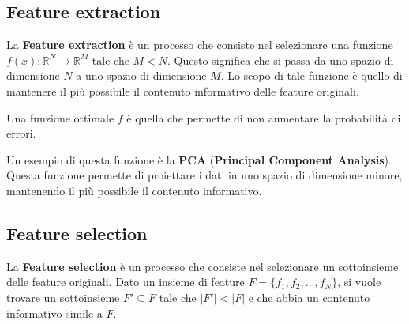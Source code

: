 \subsection{Feature extraction}
La \textbf{Feature extraction} è un processo che consiste nel selezionare una
funzione $f(x): \mathbb{R}^N \to \mathbb{R}^M$ tale che $M < N$. Questo
significa che si passa da uno spazio di dimensione $N$ a uno spazio di dimensione
$M$. Lo scopo di tale funzione è quello di mantenere il più possibile il
contenuto informativo delle feature originali.

Una funzione ottimale $f$ è quella che permette di non aumentare la probabilità
di errori.

Un esempio di questa funzione è la \textbf{PCA} (\textbf{Principal Component
      Analysis}). Questa funzione permette di proiettare i dati in uno spazio di
dimensione minore, mantenendo il più possibile il contenuto informativo.
\subsection{Feature selection}
La \textbf{Feature selection} è un processo che consiste nel selezionare un
sottoinsieme delle feature originali. Dato un insieme di feature $F = \{f_1, f_2,
      \ldots, f_N\}$, si vuole trovare un sottoinsieme $F' \subseteq F$ tale che
$|F'| < |F|$ e che abbia un contenuto informativo simile a $F$.

